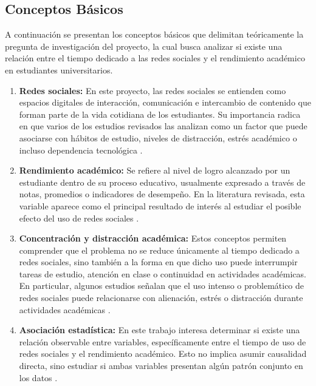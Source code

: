 \documentclass[12pt]{article}
\begin{document}


\subsection{Conceptos Básicos}

A continuación se presentan los conceptos básicos que delimitan teóricamente la pregunta de
investigación del proyecto, la cual busca analizar si existe una relación entre el tiempo dedicado
a las redes sociales y el rendimiento académico en estudiantes universitarios.

\begin{enumerate}
    \item \textbf{Redes sociales:} En este proyecto, las redes sociales se entienden como espacios
    digitales de interacción, comunicación e intercambio de contenido que forman parte de la vida
    cotidiana de los estudiantes. Su importancia radica en que varios de los estudios revisados
    las analizan como un factor que puede asociarse con hábitos de estudio, niveles de distracción,
    estrés académico o incluso dependencia tecnológica \cite{leon2023,miranda2023,ramirez2023,aljemely2020}.

    \item \textbf{Rendimiento académico:} Se refiere al nivel de logro alcanzado por un estudiante
    dentro de su proceso educativo, usualmente expresado a través de notas, promedios o indicadores
    de desempeño. En la literatura revisada, esta variable aparece como el principal resultado de
    interés al estudiar el posible efecto del uso de redes sociales \cite{leon2023,rodelomoreno2018,pasato2022,zarate2022}.

    \item \textbf{Concentración y distracción académica:} Estos conceptos permiten comprender
    que el problema no se reduce únicamente al tiempo dedicado a redes sociales, sino también a la
    forma en que dicho uso puede interrumpir tareas de estudio, atención en clase o continuidad en
    actividades académicas. En particular, algunos estudios señalan que el uso intenso o problemático
    de redes sociales puede relacionarse con alienación, estrés o distracción durante actividades
    académicas \cite{aljemely2020,ramirez2023,sotelo2023}.

    \item \textbf{Asociación estadística:} En este trabajo interesa determinar si existe una relación
    observable entre variables, específicamente entre el tiempo de uso de redes sociales y el
    rendimiento académico. Esto no implica asumir causalidad directa, sino estudiar si ambas
    variables presentan algún patrón conjunto en los datos \cite{rodelomoreno2018,leon2023}.
\end{enumerate}
\end{document}

